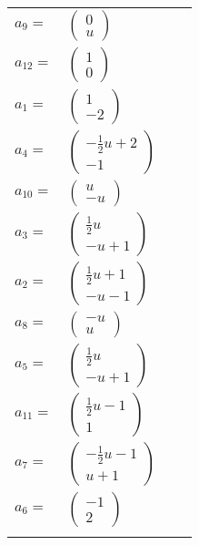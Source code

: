 \documentclass[1p]{elsarticle_modified}
\theoremstyle{definition}
\begin{document}
\begin{tabular}{m{7pt} m{180pt} m{7pt} m{180pt} }
\flushright $a_{9}=$&$\begin{pmatrix}0\\u\end{pmatrix}$ \\
\flushright $a_{12}=$&$\begin{pmatrix}1\\0\end{pmatrix}$ \\
\flushright $a_{1}=$&$\begin{pmatrix}1\\-2\end{pmatrix}$ \\
\flushright $a_{4}=$&$\begin{pmatrix}-\frac{1}{2} u+2\\-1\end{pmatrix}$ \\
\flushright $a_{10}=$&$\begin{pmatrix}u\\- u\end{pmatrix}$ \\
\flushright $a_{3}=$&$\begin{pmatrix}\frac{1}{2} u\\- u+1\end{pmatrix}$ \\
\flushright $a_{2}=$&$\begin{pmatrix}\frac{1}{2} u+1\\- u-1\end{pmatrix}$ \\
\flushright $a_{8}=$&$\begin{pmatrix}- u\\u\end{pmatrix}$ \\
\flushright $a_{5}=$&$\begin{pmatrix}\frac{1}{2} u\\- u+1\end{pmatrix}$ \\
\flushright $a_{11}=$&$\begin{pmatrix}\frac{1}{2} u-1\\1\end{pmatrix}$ \\
\flushright $a_{7}=$&$\begin{pmatrix}-\frac{1}{2} u-1\\u+1\end{pmatrix}$ \\
\flushright $a_{6}=$&$\begin{pmatrix}-1\\2\end{pmatrix}$\\&\end{tabular}
\end{document}
